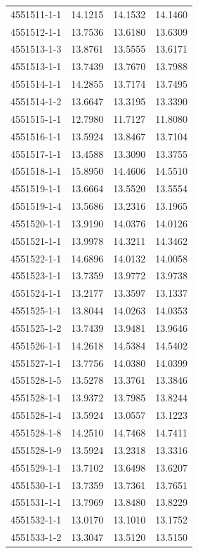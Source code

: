 \begin{longtable}{lrrr}
4551511-1-1 & 14.1215 & 14.1532 & 14.1460 \\
4551512-1-1 & 13.7536 & 13.6180 & 13.6309 \\
4551513-1-3 & 13.8761 & 13.5555 & 13.6171 \\
4551513-1-1 & 13.7439 & 13.7670 & 13.7988 \\
4551514-1-1 & 14.2855 & 13.7174 & 13.7495 \\
4551514-1-2 & 13.6647 & 13.3195 & 13.3390 \\
4551515-1-1 & 12.7980 & 11.7127 & 11.8080 \\
4551516-1-1 & 13.5924 & 13.8467 & 13.7104 \\
4551517-1-1 & 13.4588 & 13.3090 & 13.3755 \\
4551518-1-1 & 15.8950 & 14.4606 & 14.5510 \\
4551519-1-1 & 13.6664 & 13.5520 & 13.5554 \\
4551519-1-4 & 13.5686 & 13.2316 & 13.1965 \\
4551520-1-1 & 13.9190 & 14.0376 & 14.0126 \\
4551521-1-1 & 13.9978 & 14.3211 & 14.3462 \\
4551522-1-1 & 14.6896 & 14.0132 & 14.0058 \\
4551523-1-1 & 13.7359 & 13.9772 & 13.9738 \\
4551524-1-1 & 13.2177 & 13.3597 & 13.1337 \\
4551525-1-1 & 13.8044 & 14.0263 & 14.0353 \\
4551525-1-2 & 13.7439 & 13.9481 & 13.9646 \\
4551526-1-1 & 14.2618 & 14.5384 & 14.5402 \\
4551527-1-1 & 13.7756 & 14.0380 & 14.0399 \\
4551528-1-5 & 13.5278 & 13.3761 & 13.3846 \\
4551528-1-1 & 13.9372 & 13.7985 & 13.8244 \\
4551528-1-4 & 13.5924 & 13.0557 & 13.1223 \\
4551528-1-8 & 14.2510 & 14.7468 & 14.7411 \\
4551528-1-9 & 13.5924 & 13.2318 & 13.3316 \\
4551529-1-1 & 13.7102 & 13.6498 & 13.6207 \\
4551530-1-1 & 13.7359 & 13.7361 & 13.7651 \\
4551531-1-1 & 13.7969 & 13.8480 & 13.8229 \\
4551532-1-1 & 13.0170 & 13.1010 & 13.1752 \\
4551533-1-2 & 13.3047 & 13.5120 & 13.5150 \\

\end{longtable}
